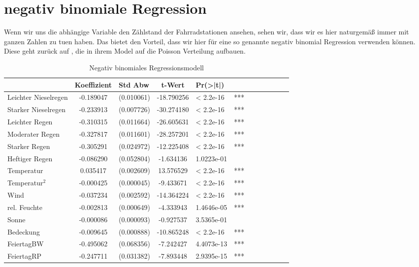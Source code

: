 \documentclass[a4paper,12pt]{thesis}
\begin{document}
\section{negativ binomiale Regression}

Wenn wir uns die abhängige Variable den Zählstand der Fahrradstationen ansehen, sehen wir, dass wir es hier naturgemäß immer mit ganzen Zahlen zu tuen haben. Das bietet den Vorteil, dass wir hier für eine so genannte negativ binomial Regression verwenden können. Diese geht zurück auf \cite{Hausman1984}, die in ihrem Model auf die Poisson Verteilung aufbauen.


\begin{table}[!ht]
	\centering
	\caption{Negativ binomiales Regressionsmodell}
	\begin{tabular}[t]{lc lc lc lc lc lc}
		\toprule
		& Koeffizient & Std Abw & t-Wert & Pr(>|t|) & \\
		\midrule
		Leichter Nieselregen & -0.189047 & (0.010061) & -18.790256 & < 2.2e-16 & *** \\
		Starker Nieselregen & -0.233913 & (0.007726) & -30.274180 & < 2.2e-16 & *** \\
		Leichter Regen & -0.310315 & (0.011664) & -26.605631 & < 2.2e-16 & *** \\
		Moderater Regen & -0.327817 & (0.011601) & -28.257201 & < 2.2e-16 & *** \\
		Starker Regen & -0.305291 & (0.024972) & -12.225408 & < 2.2e-16 & *** \\
		Heftiger Regen & -0.086290 & (0.052804) & -1.634136 & 1.0223e-01 & \\
		Temperatur & 0.035417 & (0.002609) & 13.576529 & < 2.2e-16 & *** \\
		Temperatur$^2$ & -0.000425 & (0.000045) & -9.433671 & < 2.2e-16 & *** \\
		Wind & -0.037234 & (0.002592) & -14.364224 & < 2.2e-16 & *** \\
		rel. Feuchte & -0.002813 & (0.000649) & -4.333943 & 1.4646e-05 & *** \\
		Sonne & -0.000086 & (0.000093) & -0.927537 & 3.5365e-01 & \\
		Bedeckung & -0.009645 & (0.000888) & -10.865248 & < 2.2e-16 & *** \\
		FeiertagBW & -0.495062 & (0.068356) & -7.242427 & 4.4073e-13 & *** \\
		FeiertagRP & -0.247711 & (0.031382) & -7.893448 & 2.9395e-15 & *** \\

\end{tabular}
\end{table}
\end{document}
